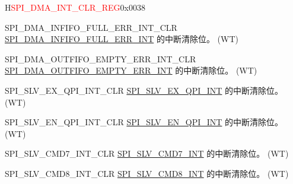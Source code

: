 \begin{register}{H}{\textcolor{red}{SPI\_DMA\_INT\_CLR\_REG}}{0x{}0038}\label{regdesc:SPIDMAINTCLRREG}
%
%
%
%
%
%
%
%
%
%
%
%
%
%
%
%
%
%
%
%
%
%
\regnewline%
\begin{regdesc}\begin{reglist}
\label{fielddesc:SPIDMAINFIFOFULLERRINTCLR}\item [SPI\_DMA\_INFIFO\_FULL\_ERR\_INT\_CLR] \hyperref[int:SPIINFIFOFULLERRINT]{SPI\_DMA\_INFIFO\_FULL\_ERR\_INT} 的中断清除位。 (WT)
\label{fielddesc:SPIDMAOUTFIFOEMPTYERRINTCLR}\item [SPI\_DMA\_OUTFIFO\_EMPTY\_ERR\_INT\_CLR] \hyperref[int:SPIOUTFIFOEMPTYERRINT]{SPI\_DMA\_OUTFIFO\_EMPTY\_ERR\_INT} 的中断清除位。 (WT)
\label{fielddesc:SPISLVEXQPIINTCLR}\item [SPI\_SLV\_EX\_QPI\_INT\_CLR] \hyperref[int:SPISLVEXQPIINT]{SPI\_SLV\_EX\_QPI\_INT} 的中断清除位。 (WT)
\label{fielddesc:SPISLVENQPIINTCLR}\item [SPI\_SLV\_EN\_QPI\_INT\_CLR] \hyperref[int:SPISLVENQPIINT]{SPI\_SLV\_EN\_QPI\_INT} 的中断清除位。 (WT)
\label{fielddesc:SPISLVCMD7INTCLR}\item [SPI\_SLV\_CMD7\_INT\_CLR] \hyperref[int:SPISLVCMD7INT]{SPI\_SLV\_CMD7\_INT} 的中断清除位。 (WT)
\label{fielddesc:SPISLVCMD8INTCLR}\item [SPI\_SLV\_CMD8\_INT\_CLR] \hyperref[int:SPISLVCMD8INT]{SPI\_SLV\_CMD8\_INT} 的中断清除位。 (WT)

\end{reglist}
\end{regdesc}
\end{register}

